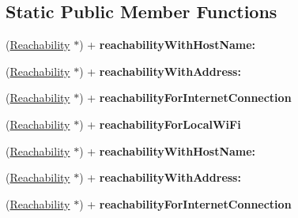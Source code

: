 \subsection*{\-Static \-Public \-Member \-Functions}
\begin{DoxyCompactItemize}
\item 
\hypertarget{interface_reachability_a0c293c3ffea29c42e8ccbd5d2b39a769}{
(\hyperlink{interface_reachability}{\-Reachability} $\ast$) + {\bfseries reachability\-With\-Host\-Name\-:}}
\label{interface_reachability_a0c293c3ffea29c42e8ccbd5d2b39a769}

\item 
\hypertarget{interface_reachability_add9b3533dfed13fc2215cc27bca74ace}{
(\hyperlink{interface_reachability}{\-Reachability} $\ast$) + {\bfseries reachability\-With\-Address\-:}}
\label{interface_reachability_add9b3533dfed13fc2215cc27bca74ace}

\item 
\hypertarget{interface_reachability_ad2962f5292dee6a56f43175d344c3da1}{
(\hyperlink{interface_reachability}{\-Reachability} $\ast$) + {\bfseries reachability\-For\-Internet\-Connection}}
\label{interface_reachability_ad2962f5292dee6a56f43175d344c3da1}

\item 
\hypertarget{interface_reachability_afef931b75654390d24d9c897835929f5}{
(\hyperlink{interface_reachability}{\-Reachability} $\ast$) + {\bfseries reachability\-For\-Local\-Wi\-Fi}}
\label{interface_reachability_afef931b75654390d24d9c897835929f5}

\item 
\hypertarget{interface_reachability_a0c293c3ffea29c42e8ccbd5d2b39a769}{
(\hyperlink{interface_reachability}{\-Reachability} $\ast$) + {\bfseries reachability\-With\-Host\-Name\-:}}
\label{interface_reachability_a0c293c3ffea29c42e8ccbd5d2b39a769}

\item 
\hypertarget{interface_reachability_add9b3533dfed13fc2215cc27bca74ace}{
(\hyperlink{interface_reachability}{\-Reachability} $\ast$) + {\bfseries reachability\-With\-Address\-:}}
\label{interface_reachability_add9b3533dfed13fc2215cc27bca74ace}

\item 
\hypertarget{interface_reachability_ad2962f5292dee6a56f43175d344c3da1}{
(\hyperlink{interface_reachability}{\-Reachability} $\ast$) + {\bfseries reachability\-For\-Internet\-Connection}}
\label{interface_reachability_ad2962f5292dee6a56f43175d344c3da1}


\end{DoxyCompactItemize}
